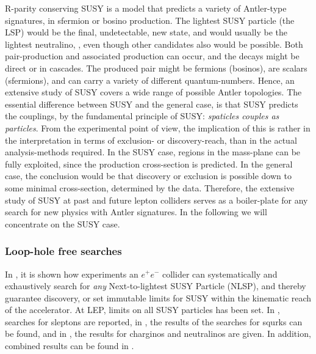 R-parity conserving SUSY is a model that predicts a variety of
Antler-type signatures, 
in sfermion or bosino production.
The lightest SUSY particle (the LSP) would be the final,
undetectable, new state, and would usually be the lightest
neutralino, , even though other candidates also
would be possible.
Both pair-production and associated production can occur,
and the decays might be direct or in cascades.
The produced pair might be fermions (bosinos),
are scalars (sfermions),
and can carry a variety of different quantum-numbers.
Hence,
an extensive study of SUSY covers a wide range of possible
Antler topologies.
The essential difference between SUSY and the general case,
is that SUSY predicts the couplings, 
by the fundamental principle of SUSY:
{\it spaticles couples as particles}.
From the experimental point of view,
the implication of this is rather in the interpretation in terms
of exclusion- or discovery-reach,
than in the actual analysis-methods required.
In the SUSY case, 
regions in the mass-plane can be fully exploited, 
since the production cross-section is predicted.
In the general case,
the conclusion would be that discovery or exclusion is
possible down to some minimal cross-section,
determined by the data.
Therefore,
the extensive study of SUSY at past and future lepton colliders
serves as a boiler-plate for any search for new physics with
Antler signatures.
In the following we will concentrate on the SUSY case.


\subsubsection{Loop-hole free searches}
\label{subsec:searches_noloophole}
In \cite{Berggren:2013vna},
it is shown how experiments an $e^+e^-$ collider can systematically and exhaustively
search for {\it any} Next-to-lightest SUSY Particle (NLSP), and thereby guarantee discovery, 
or set immutable limits for SUSY within the kinematic reach of the accelerator.
At LEP, 
limits on all SUSY particles has been set.
In
\cite{Abdallah:2003xe,Heister:2001nk,Achard:2003ge,Abbiendi:2003ji},
searches for sleptons are reported, in 
\cite{Abdallah:2003xe,Achard:2003ge,Heister:2002hp,Abbiendi:2002mp},
the results of the searches for squrks can be found, 
and in \cite{Abdallah:2003xe,Abbiendi:2003sc,Heister:2002mn,Acciarri:1999km},
the results for charginos and neutralinos are given.
In addition,
combined results can be found in \cite{
LEPSUSYWG/04-01.1,*LEPSUSYWG/04-02.1,*LEPSUSYWG/02-04.1,*LEPSUSYWG/01-03.1}.

